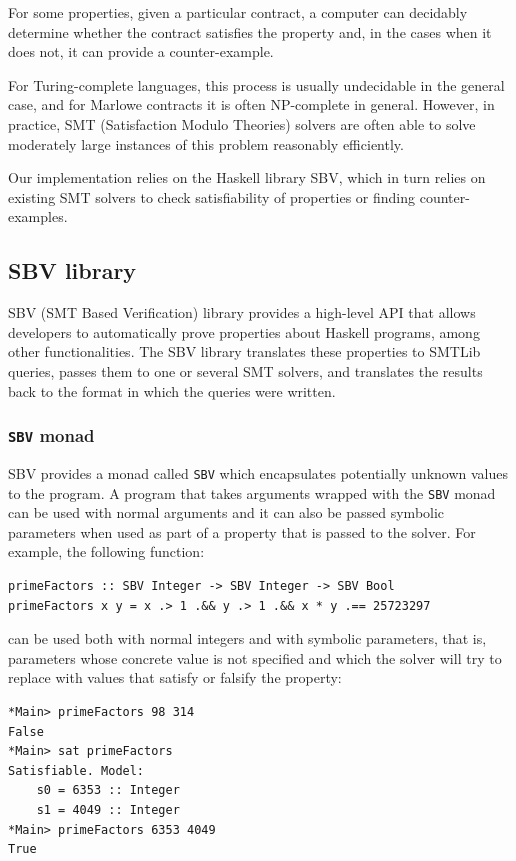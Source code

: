 \documentclass[runningheads]{llncs}
\begin{document}
For some properties, given a particular contract, a computer can decidably determine whether the contract satisfies the property and, in the cases when it does not, it can provide a counter-example.

For Turing-complete languages, this process is usually undecidable in the general case, and for Marlowe contracts it is often NP-complete in general. However, in practice, SMT (Satisfaction Modulo Theories) solvers are often able to solve moderately large instances of this problem reasonably efficiently.

Our implementation relies on the Haskell library SBV, which in turn relies on existing SMT solvers to check satisfiability of properties or finding counter-examples.

\subsection{SBV library}

SBV \cite{SBV} (SMT Based Verification) library provides a high-level API that allows developers to automatically prove properties about Haskell programs, among other functionalities.
The SBV library translates these properties to SMTLib queries, passes them to one or several SMT solvers, and translates the results back to the format in which the queries were written.

\subsubsection{\texttt{SBV} monad}

SBV provides a monad called \texttt{SBV} which encapsulates potentially unknown values to the program. A program that takes arguments wrapped with the \texttt{SBV} monad can be used with normal arguments and it can also be passed symbolic parameters when used as part of a property that is passed to the solver.
For example, the following function:

\begin{verbatim}
primeFactors :: SBV Integer -> SBV Integer -> SBV Bool
primeFactors x y = x .> 1 .&& y .> 1 .&& x * y .== 25723297
\end{verbatim}

\noindent
can be used both with normal integers and with symbolic parameters, that is, parameters whose concrete value is not specified and which the solver will try to replace with values that satisfy or falsify the property:

\begin{verbatim}
*Main> primeFactors 98 314
False
*Main> sat primeFactors
Satisfiable. Model:
    s0 = 6353 :: Integer
    s1 = 4049 :: Integer
*Main> primeFactors 6353 4049
True
\end{verbatim}
\end{document}

